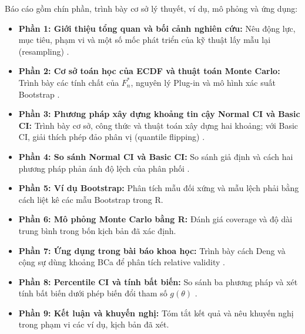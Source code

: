 	Báo cáo gồm chín phần, trình bày cơ sở lý thuyết, ví dụ, mô phỏng và ứng dụng:
	\begin{itemize}
		\item \textbf{Phần 1: Giới thiệu tổng quan và bối cảnh nghiên cứu:} Nêu động lực, mục tiêu, phạm vi và một số mốc phát triển của kỹ thuật lấy mẫu lại (resampling) \cite{efron1979}.
		\item \textbf{Phần 2: Cơ sở toán học của ECDF và thuật toán Monte Carlo:} Trình bày các tính chất của $F_n^*$, nguyên lý Plug-in và mô hình xác suất Bootstrap \cite{buithuytrang2026}.
		\item \textbf{Phần 3: Phương pháp xây dựng khoảng tin cậy Normal CI và Basic CI:} Trình bày cơ sở, công thức và thuật toán xây dựng hai khoảng; với Basic CI, giải thích phép đảo phân vị (quantile flipping) \cite{efron1993}.
		\item \textbf{Phần 4: So sánh Normal CI và Basic CI:} So sánh giả định và cách hai phương pháp phản ánh độ lệch của phân phối \cite{davison1997}.
		\item \textbf{Phần 5: Ví dụ Bootstrap:} Phân tích mẫu đối xứng và mẫu lệch phải bằng cách liệt kê các mẫu Bootstrap trong R.
		\item \textbf{Phần 6: Mô phỏng Monte Carlo bằng R:} Đánh giá coverage và độ dài trung bình trong bốn kịch bản đã xác định.
		\item \textbf{Phần 7: Ứng dụng trong bài báo khoa học:} Trình bày cách Deng và cộng sự dùng khoảng BCa để phân tích relative validity \cite{deng2013}.
		\item \textbf{Phần 8: Percentile CI và tính bất biến:} So sánh ba phương pháp và xét tính bất biến dưới phép biến đổi tham số $g(\theta)$ \cite{efron1993}.
		\item \textbf{Phần 9: Kết luận và khuyến nghị:} Tóm tắt kết quả và nêu khuyến nghị trong phạm vi các ví dụ, kịch bản đã xét.
	\end{itemize}
	
	\newpage
	
	\setcounter{page}{1}
	
	\renewcommand{\contentsname}{\Large\bfseries MỤC LỤC}
	\tableofcontents
	
	\newpage
	\setcounter{page}{1}
	
